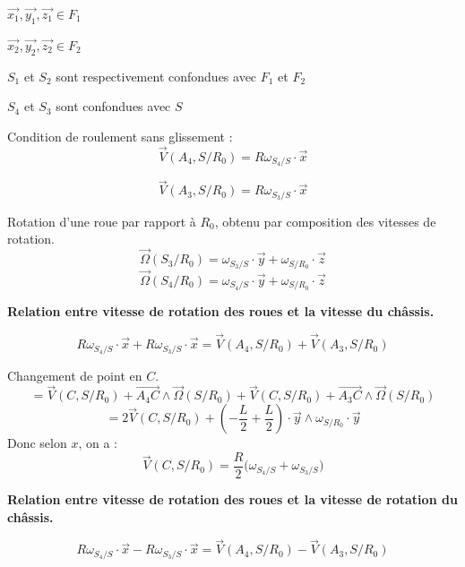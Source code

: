 \documentclass[a4paper,12pt]{report}  %
\begin{document}
$\vec{x_1},\vec{y_1},\vec{z_1} \in F_1$ 

$\vec{x_2},\vec{y_2},\vec{z_2} \in F_2$ 

$S_1$ et $S_2$ sont respectivement confondues avec $F_1$ et $F_2$ 

$S_4$ et $S_3$ sont confondues avec $S$ 




Condition de roulement sans glissement : 
\begin{equation*}
	\vec{V}(A_4, S/R_0) = R\omega_{S_4/S} \cdot \vec{x} \tag{1}
\end{equation*}

\begin{equation*}
	\vec{V}(A_3, S/R_0)=R\omega_{S_3/S} \cdot \vec{x} \tag{2}
\end{equation*}

Rotation d'une roue par rapport à $R_0$, obtenu par composition des vitesses de rotation. 
\begin{equation*}
	\vec{\Omega}(S_3/R_0) = \omega_{S_3/S} \cdot \vec{y} + \omega_{S/R_0} \cdot \vec{z} \tag{3}
\end{equation*}
\begin{equation*}    
	\vec{\Omega}(S_4/R_0) = \omega_{S_4/S} \cdot \vec{y} + \omega_{S/R_0} \cdot \vec{z} \tag{4}
\end{equation*}


\textbf{Relation entre vitesse de rotation des roues et la vitesse du châssis.} 

\begin{equation*}
	R\omega_{S_4/S} \cdot \vec{x} + R\omega_{S_3/S} \cdot \vec{x} =
	\vec{V}(A_4, S/R_0) + \vec{V}(A_3, S/R_0) 
	\tag{1)+(2}
\end{equation*}

Changement de point en $C$. 
$$ = \vec{V}(C,S/R_0) 
+ \overrightarrow{A_{4}C} \wedge \vec{\Omega}(S/R_0) 
+ \vec{V}(C,S/R_0) 
+ \overrightarrow{A_{3}C} \wedge \vec{\Omega}(S/R_0) 
$$
$$
= 2\vec{V}(C,S/R_0) + (-\frac{L}{2} + \frac{L}{2}) \cdot \vec{y} \wedge \omega_{S/R_0} \cdot \vec{y}
$$
Donc selon $x$, on a : 
$$
\boxed{
	\vec{V}(C,S/R_0) = \frac{R}{2}\bigg( \omega_{S_4/S} + \omega_{S_3/S} \bigg)
}
$$


\textbf{Relation entre vitesse de rotation des roues et la vitesse de rotation du châssis.} 

\begin{equation*}
	R\omega_{S_4/S} \cdot \vec{x} - R\omega_{S_3/S} \cdot \vec{x} =
	\vec{V}(A_4, S/R_0) - \vec{V}(A_3, S/R_0) 
	\tag{1)–(2}
\end{equation*}
\end{document}
